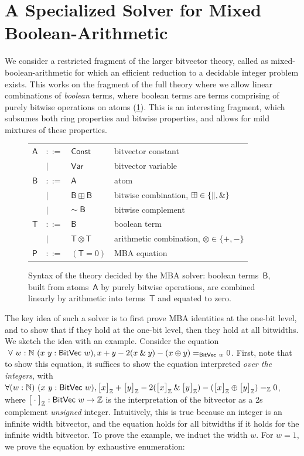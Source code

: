 \section{A Specialized Solver for Mixed Boolean-Arithmetic}
\label{sec:swbv:mba}

We consider a restricted fragment of the larger bitvector theory, called as mixed-boolean-arithmetic \cite{liu2021mba}
for which an efficient reduction to a decidable integer problem exists.
This works on the fragment of the full theory where we allow linear combinations of \emph{boolean} terms,
where boolean terms are terms comprising of purely bitwise operations on atoms (\cref{fig:swbv:mba-syntax}).
This is an interesting fragment, which subsumes both ring properties and bitwise properties,
and allows for mild mixtures of these properties.

\begin{figure}[htb]
\centering
{\footnotesize
\begin{tabular}{llll}
$\mathsf{A}$ & $::=$ & $\mathsf{Const}$ & bitvector constant \\
    & $\mid$ & $\mathsf{Var}$ & bitvector variable \\[4pt]
$\mathsf{B}$ & $::=$ & $\mathsf{A}$ & atom \\
    & $\mid$ & $\mathsf{B} \boxplus \mathsf{B}$ & bitwise combination, $\boxplus \in \{\|, \mathbin{\&}\}$ \\
    & $\mid$ & $\sim \mathsf{B}$ & bitwise complement \\[4pt]
$\mathsf{T}$ & $::=$ & $\mathsf{B}$ & boolean term \\
    & $\mid$ & $\mathsf{T} \otimes \mathsf{T}$ & arithmetic combination, $\otimes \in \{+, -\}$ \\[4pt]
$\mathsf{P}$ & $::=$ & $(\mathsf{T} = 0)$ & MBA equation \\
\end{tabular}
}
\caption{Syntax of the theory decided by the MBA solver: boolean
terms~$\mathsf{B}$, built from atoms~$\mathsf{A}$ by purely bitwise
operations, are combined linearly by arithmetic into terms~$\mathsf{T}$ and
equated to zero.}
\label{fig:swbv:mba-syntax}
\end{figure}

The key idea of such a solver is to first prove MBA identities at the one-bit level,
and to show that if they hold at the one-bit level, then they hold at all bitwidths.
We sketch the idea with an example.
Consider the equation $~\forall~{w : \mathbb N}~(x~y : \mathsf{BitVec}~{w}),x + y - 2 (x \mathbin{\&} y) - (x \oplus y) =_{\mathsf{BitVec}~{w}} 0$.
First, note that to show this equation, it suffices to show the equation interpreted \emph{over the integers},
with $\forall (w : \mathbb N)~(x~y : \mathsf{BitVec}~{w}), \big[ x \big]_{\tiny \mathbb Z} + \big[ y \big]_{\tiny \mathbb Z} - 2 (\big[ x \big]_{\tiny \mathbb Z} \mathbin{\&} \big[ y \big]_{\tiny \mathbb Z}) - (\big[ x \big]_{\tiny \mathbb Z} \oplus \big[ y \big]_{\tiny \mathbb Z}) =_{\mathbb Z} 0$,
where $\big[ \cdot \big]_{\tiny \mathbb Z} : \mathsf{BitVec}~{w} \to \mathbb Z$ is the interpretation of the bitvector as a 2s complement \emph{unsigned} integer.
Intuitively, this is true because an integer is an infinite width bitvector,
and the equation holds for all bitwidths if it holds for the infinite width bitvector.
To prove the example, we induct the width $w$.
For $w = 1$, we prove the equation by exhaustive enumeration:


